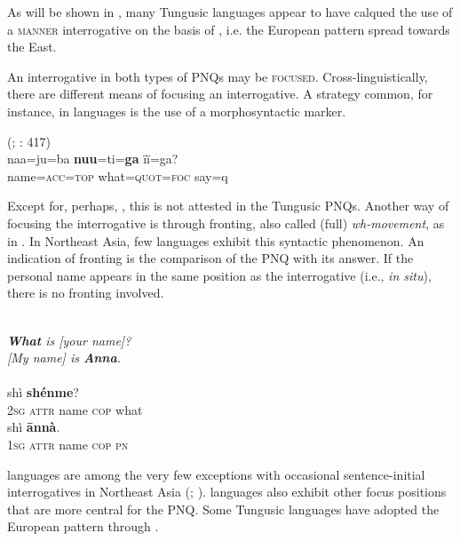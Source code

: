 \documentclass[output=paper,colorlinks,citecolor=brown]{langscibook}
\begin{document}
\noindent As will be shown in , many Tungusic languages appear to have calqued the use of a \textsc{manner} interrogative on the basis of , i.e. the European pattern spread towards the East.

An interrogative in both types of PNQs may be \textsc{focused}. Cross-linguistically, there are different means of focusing an interrogative. A strategy common, for instance, in  languages is the use of a morphosyntactic marker.

\ea
    \label{example4.28}
     (; \citealt{Aoi2015}: 417)\\
    \gll naa=ju=ba		\textbf{nuu}=ti=\textbf{ga}			ïï=ga?\\
    name=\textsc{acc=top}	what=\textsc{quot=foc}		say={q}\\
    \z

\noindent Except for, perhaps, , this is not attested in the Tungusic PNQs. Another way of focusing the interrogative is through fronting, also called (full) \textit{wh-movement}, as in . In Northeast Asia, few languages exhibit this syntactic phenomenon. An indication of fronting is the comparison of the PNQ with its answer. If the personal name appears in the same position as the interrogative (i.e., \textit{in situ}), there is no fronting involved.

\ea
    \label{example4.29}
    \\
    \ea 
    \textit{\textbf{What} is [your name]?}\\
    \ex 
    \textit{[My name] is \textbf{Anna}.}\\
    \z
\ex
    \label{example4.30}
    \\
    \ea
    \gll [nǐ		de		míngzi]		shì		\textbf{shénme}?\\
    2\textsc{sg}		\textsc{attr}		name		\textsc{cop}		what\\

    \ex
    \gll [wǒ		de		míngzi]		shì		\textbf{ānnà}.\\
    1\textsc{sg}		\textsc{attr}		name		\textsc{cop}		\textsc{pn}\\
    \z
\z

 languages are among the very few exceptions with occasional sentence-initial interrogatives in Northeast Asia (\citealt{Dryer2013}; \citealt{Hölzl2018a}).  languages also exhibit other focus positions that are more central for the PNQ. Some Tungusic languages have adopted the European pattern through .
\end{document}
